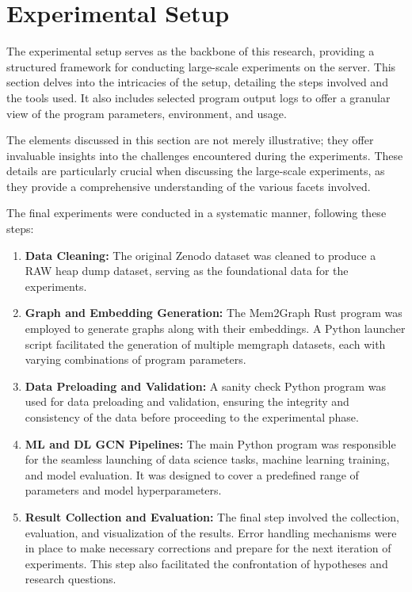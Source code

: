\section{Experimental Setup}

The experimental setup serves as the backbone of this research, providing a structured framework for conducting large-scale experiments on the server. This section delves into the intricacies of the setup, detailing the steps involved and the tools used. It also includes selected program output logs to offer a granular view of the program parameters, environment, and usage.

The elements discussed in this section are not merely illustrative; they offer invaluable insights into the challenges encountered during the experiments. These details are particularly crucial when discussing the large-scale experiments, as they provide a comprehensive understanding of the various facets involved.

The final experiments were conducted in a systematic manner, following these steps:

\begin{enumerate}
    \item \textbf{Data Cleaning:} The original Zenodo dataset was cleaned to produce a RAW heap dump dataset, serving as the foundational data for the experiments.
    
    \item \textbf{Graph and Embedding Generation:} The Mem2Graph Rust program was employed to generate graphs along with their embeddings. A Python launcher script facilitated the generation of multiple memgraph datasets, each with varying combinations of program parameters.
    
    \item \textbf{Data Preloading and Validation:} A sanity check Python program was used for data preloading and validation, ensuring the integrity and consistency of the data before proceeding to the experimental phase.
    
    \item \textbf{ML and DL GCN Pipelines:} The main Python program was responsible for the seamless launching of data science tasks, machine learning training, and model evaluation. It was designed to cover a predefined range of parameters and model hyperparameters.
    
    \item \textbf{Result Collection and Evaluation:} The final step involved the collection, evaluation, and visualization of the results. Error handling mechanisms were in place to make necessary corrections and prepare for the next iteration of experiments. This step also facilitated the confrontation of hypotheses and research questions.
\end{enumerate}


